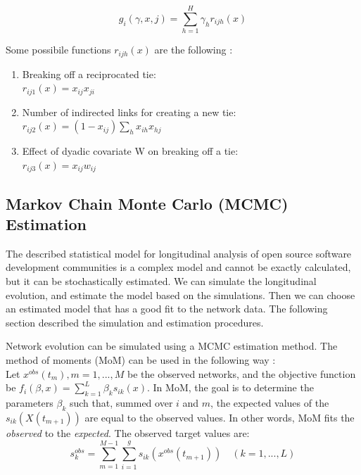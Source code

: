 \documentclass[11pt]{report}
\begin{document}
\begin{equation}
g_i(\gamma, x, j) = \sum_{h = 1}^{H} \gamma_h r_{ijh}(x)
\end{equation}

Some possibile functions $r_{ijh}(x)$ are the following \cite{Snijders2004}:
\begin{enumerate}
\item Breaking off a reciprocated tie:\\ 
$r_{ij1}(x) = x_{ij} x_{ji}$
\item Number of indirected links for creating a new tie:\\ $r_{ij2}(x) = (1 - x_{ij}) \sum_h x_{ih} x_{hj}$
\item Effect of dyadic covariate W on breaking off a tie:\\
$r_{ij3}(x) = x_{ij}w_{ij}$
\end{enumerate}

\subsection{Markov Chain Monte Carlo (MCMC) Estimation}
\label{estimation}
The described statistical model for longitudinal analysis of open source software development communities is a complex model and cannot be exactly calculated, but it can be stochastically estimated. We can simulate the longitudinal evolution, and estimate the model based on the simulations. Then we can choose an estimated model that has a good fit to the network data.
The following section described the simulation and estimation procedures. 


Network evolution can be simulated using a MCMC estimation method. The method of moments (MoM) can be used in the following way \cite{Snijders2004}: \\

Let $x^{obs}(t_m), m = 1, ..., M$ be the observed networks, and the objective function be $f_i(\beta, x) = \sum_{k=1}^L \beta_k s_{ik}(x)$. 
In MoM, the goal is to determine the parameters $\beta_k$ such that, summed over $i$ and $m$, the expected values of the $s_{ik}(X(t_{m+1}))$ are equal to the observed values. In other words, MoM fits the \textit{observed} to the \textit{expected}. 
The observed target values are:
\begin{equation}
s_k^{obs} = \sum_{m=1}^{M-1}\sum_{i=1}^g s_{ik}(x^{obs}(t_{m+1})) \quad (k = 1, ..., L)
\end{equation}
\end{document}

